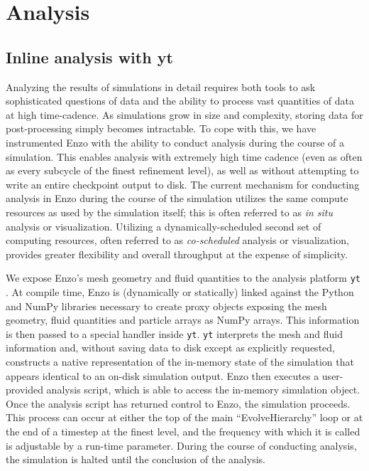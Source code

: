 \section{Analysis}
\label{sec.num.analysis}

\subsection{Inline analysis with yt}

Analyzing the results of simulations in detail requires both tools to ask
sophisticated questions of data and the ability to process vast quantities of
data at high time-cadence.  As simulations grow in size and complexity, storing data
for post-processing simply becomes intractable.  To cope with this, we have
instrumented Enzo with the ability to conduct analysis during the course of a
simulation.  This enables analysis with extremely high time cadence (even as often
as every subcycle of the finest refinement level), as well as without
attempting to write an entire checkpoint output to disk.  The current mechanism
for conducting analysis in Enzo during the course of the simulation utilizes
the same compute resources as used by the simulation itself; this is often
referred to as \textit{in situ} analysis or visualization.  Utilizing a
dynamically-scheduled second set of computing resources, often referred to as
\textit{co-scheduled} analysis or visualization, provides greater flexibility and overall
throughput at the expense of simplicity.

We expose Enzo's mesh geometry and fluid quantities to the analysis platform
\texttt{yt} \citep{2011ApJS..192....9T, 2011arXiv1112.4482T}.  At compile time,
Enzo is (dynamically or statically) linked against the Python and NumPy
libraries necessary to create proxy objects exposing the mesh geometry,
fluid quantities and particle arrays as NumPy arrays.  This information is then
passed to a special handler inside \texttt{yt}.  \texttt{yt} interprets the
mesh and fluid information and, without saving data to disk except as
explicitly requested, constructs a native representation of the in-memory state
of the simulation that appears identical to an on-disk simulation output.
Enzo then executes a user-provided analysis script, which is able to access the
in-memory simulation object.  Once the analysis script has returned control to
Enzo, the simulation proceeds.  This process can occur at either the top of the
main ``EvolveHierarchy'' loop or at the end of a timestep at the finest level,
and the frequency with which it is called is adjustable by a run-time
parameter.  During the course of conducting analysis, the simulation is halted
until the conclusion of the analysis.

